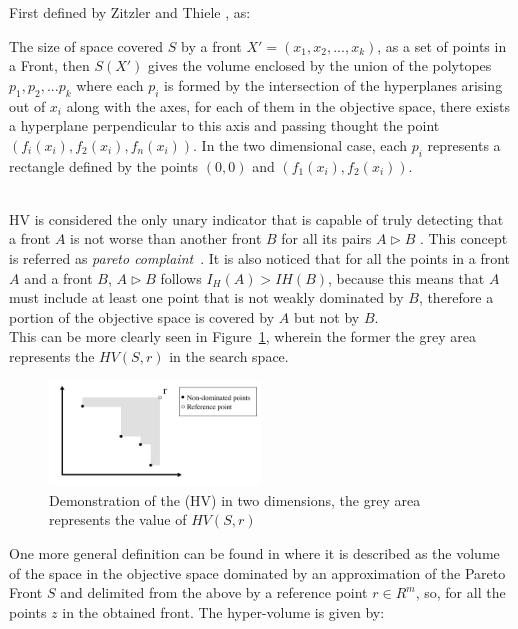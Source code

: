 First defined by Zitzler and Thiele \cite{zitzler1999multiobjective}, as:

\begin{definition}
The size of space covered $S$ by a front $X' = (x_1, x_2,...,x_k)$, as a set of points in a Front, then $S(X')$ gives the volume enclosed by the union of the polytopes $p_1, p_2,... p_k$ where each $p_i$ is formed by the intersection of the hyperplanes arising out of ${x_i}$ along with the axes, for each of them in the objective space, there exists a hyperplane perpendicular to this axis and passing thought the point $(f_i(x_i), f_2(x_i), f_n(x_i))$. In the two dimensional case, each $p_i$ represents a rectangle defined by the points $(0,0)$ and $(f_1(x_i),f_2(x_i))$.
\end{definition}\\

HV is considered the only unary indicator that is capable of truly detecting that a front $A$ is not worse than another front $B$ for all its pairs $A\triangleright B $ \cite{zitzler2003performance}.  This concept is referred as \textit{pareto complaint}~\cite{ishibuchi2015study}. It is also noticed that for all the points in a front $A$ and a front $B$, $A \triangleright B $ follows $I_H(A) > IH(B)$, because this means that $A$ must include at least one point that is not weakly dominated by $B$, therefore a portion of the objective space is covered by $A$ but not by $B$.\\

This can be more clearly seen in Figure~\ref{fig:hv_graph}, wherein the former the grey area represents the $HV(S,r)$ in the search space.\\

\begin{figure}
    \centering
    \includegraphics[width=0.5\textwidth]{images/hv_graph.png}
    \caption{Demonstration of the (HV) in two dimensions, the grey area represents the value of $HV(S,r)$}
    \label{fig:hv_graph}
\end{figure}

One more general definition can be found in \cite{audet2018performance} where it is described as the volume of the space in the objective space dominated by an approximation of the Pareto Front $S$ and delimited from the above by a reference point $r \in R^{m} $, so, for all the points $z$ in the obtained front. The hyper-volume is given by:

